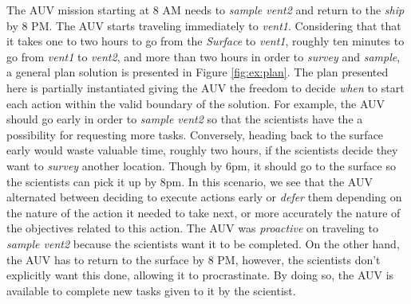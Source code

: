 The AUV mission starting at 8 AM needs to {\em sample vent2} and
return to the {\em ship} by 8 PM. The AUV starts traveling immediately
to {\em vent1}. Considering that that it takes one to two hours to go
from the {\em Surface} to {\em vent1}, roughly ten minutes to go from
{\em vent1} to {\em vent2}, and more than two hours in order to {\em
survey} and {\em sample}, a general plan solution is presented in
Figure \ref{fig:ex:plan}. The plan presented here is partially
instantiated giving the AUV the freedom to decide {\em when} to start
each action within the valid boundary of the solution. For example,
the AUV should go early in order to {\em sample vent2} so that the
scientists have the a possibility for requesting more
tasks. Conversely, heading back to the surface early would waste
valuable time, roughly two hours, if the scientists decide they want to
{\em survey} another location. Though by 6pm, it should go to the
surface so the scientists can pick it up by 8pm. In this scenario, we
see that the AUV alternated between deciding to execute actions early
or {\em defer} them depending on the nature of the action it needed to
take next, or more accurately the nature of the objectives related to
this action. The AUV was {\em proactive} on traveling to {\em sample vent2}
because the scientists want it to be completed. On the other hand, the
AUV has to return to the surface by 8 PM, however, the scientists don't
explicitly want this done, allowing it to procrastinate.  By
doing so, the AUV is available to complete new tasks given to it by
the scientist.


